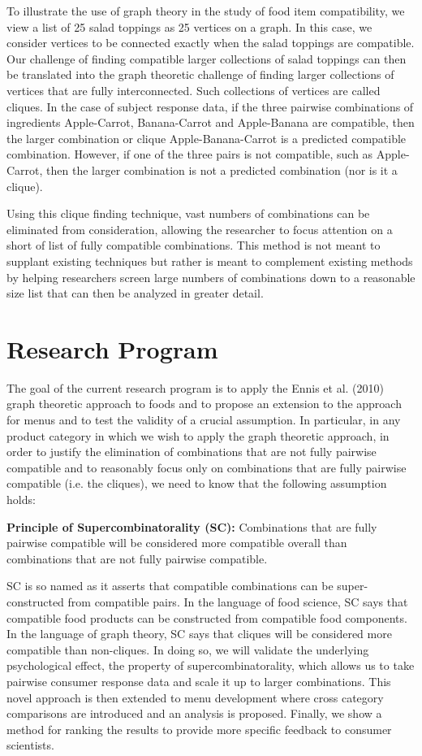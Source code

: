 To illustrate the use of graph theory in the study of food item compatibility, we view a list of 25 salad toppings as 25 vertices on a graph.  In this case, we consider vertices to be connected exactly when the salad toppings are compatible.  Our challenge of finding compatible larger collections of salad toppings can then be translated into the graph theoretic challenge of finding larger collections of vertices that are fully interconnected.  Such collections of vertices are called cliques.  In the case of subject response data, if the three pairwise combinations of ingredients Apple-Carrot, Banana-Carrot and Apple-Banana are compatible, then the larger combination or clique Apple-Banana-Carrot is a predicted compatible combination.  However, if one of the three pairs is not compatible, such as Apple-Carrot, then the larger combination is not a predicted combination (nor is it a clique).  

Using this clique finding technique, vast numbers of combinations can be eliminated from consideration, allowing the researcher to focus attention on a short of list of fully compatible combinations.  This method is not meant to supplant existing techniques but rather is meant to complement existing methods by helping researchers screen large numbers of combinations down to a reasonable size list that can then be analyzed in greater detail.  

\section{Research Program}
The goal of the current research program is to apply the Ennis et al. (2010) graph theoretic approach to foods and to propose an extension to the approach for menus and to test the validity of a crucial assumption.  In particular, in any product category in which we wish to apply the graph theoretic approach, in order to justify the elimination of combinations that are not fully pairwise compatible and to reasonably focus only on combinations that are fully pairwise compatible (i.e. the cliques), we need to know that the following assumption holds:

\noindent
{\bf Principle of Supercombinatorality (SC):} Combinations that are fully pairwise compatible will be considered more compatible overall than combinations that are not fully pairwise compatible.

SC is so named as it asserts that compatible combinations can be super-constructed from compatible pairs.  In the language of food science, SC says that compatible food products can be constructed from compatible food components.  In the language of graph theory, SC says that cliques will be considered more compatible than non-cliques.
In doing so, we will validate the underlying psychological effect, the property of supercombinatorality, which allows us to take pairwise consumer response data and scale it up to larger combinations.  This novel approach is then extended to menu development where cross category comparisons are introduced and an analysis is proposed.  Finally, we show a method for ranking the results to provide more specific feedback to consumer scientists.  

